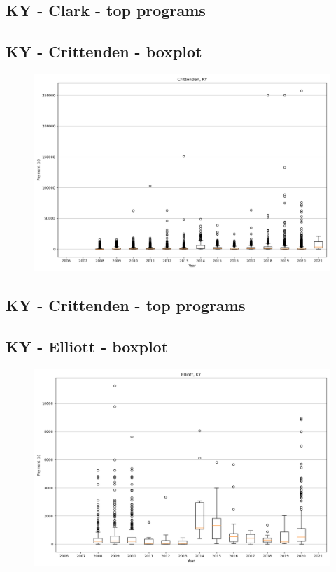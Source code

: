 \subsection*{KY - Clark - top programs}

\newpage
\subsection*{KY - Crittenden - boxplot}
\begin{figure}[h]
\centering
\includegraphics[width=7in]{../output/boxplots/counties/Crittenden-KY_boxplot.png}
\end{figure}


\subsection*{KY - Crittenden - top programs}

\newpage
\subsection*{KY - Elliott - boxplot}
\begin{figure}[h]
\centering
\includegraphics[width=7in]{../output/boxplots/counties/Elliott-KY_boxplot.png}
\end{figure}


